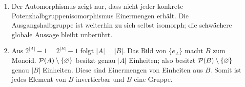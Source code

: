 \documentclass[main.tex]{subfiles}
\begin{document}
\begin{enumerate}
  \item Der Automorphismus zeigt nur, dass nicht jeder konkrete
    Potenzhalbgruppenisomorphismus Einermengen erhält.  Die
    Ausgangshalbgruppe ist weiterhin zu sich selbst isomorph; die schwächere
    globale Aussage bleibt unberührt.

  \item Aus \(2^{|A|}-1=2^{|B|}-1\) folgt \(|A|=|B|\).  Das Bild von
    \(\{e_A\}\) macht \(B\) zum Monoid.  \(\mathcal{P}(A)\setminus\{\varnothing\}\) besitzt genau
    \(|A|\) Einheiten; also besitzt \(\mathcal{P}(B)\setminus\{\varnothing\}\) genau \(|B|\) Einheiten.
    Diese sind Einermengen von Einheiten aus \(B\).  Somit ist jedes Element
    von \(B\) invertierbar und \(B\) eine Gruppe.
\end{enumerate}
\end{document}
